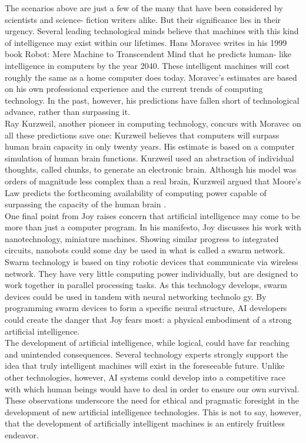 The scenarios above are just a few of the many that have been considered by
scientists and science- fiction writers alike. But their significance lies in their urgency.
Several leading technological minds believe that machines with this kind of intelligence
may exist within our lifetimes. Hans Moravec writes in his 1999 book Robot: Mere
Machine to Transcendent Mind that he predicts human- like intelligence in computers by
the year 2040. These intelligent machines will cost roughly the same as a home computer
does today. Moravec’s estimates are based on his own professional experience and the
current trends of computing technology. In the past, however, his predictions have fallen
short of technological advance, rather than surpassing it.\\
Ray Kurzweil, another pioneer in computing technology, concurs with Moravec
on all these predictions save one: Kurzweil believes that computers will surpass human
brain capacity in only twenty years. His estimate is based on a computer simulation of
human brain functions. Kurzweil used an abstraction of individual thoughts, called
chunks, to generate an electronic brain. Although his model was orders of magnitude less
complex than a real brain, Kurzweil argued that Moore’s Law predicts the forthcoming
availability of computing power capable of surpassing the capacity of the human brain
.\\
One final point from Joy raises concern that artificial intelligence may come to be
more than just a computer program. In his manifesto, Joy discusses his work with
nanotechnology, miniature machines. Showing similar progress to integrated circuits,
nanobots could some day be used in what is called a swarm network. Swarm technology
is based on tiny robotic devices that communicate via wireless network. They have very
little computing power individually, but are designed to work together in parallel
processing tasks. As this technology develops, swarm devices could be used in tandem
with neural networking technolo gy. By programming swarm devices to form a specific
neural structure, AI developers could create the danger that Joy fears most: a physical
embodiment of a strong artificial intelligence.\\
The development of artificial intelligence, while logical, could have far reaching
and unintended consequences. Several technology experts strongly support the idea that
truly intelligent machines will exist in the foreseeable future. Unlike other technologies,
however, AI systems could develop into a competitive race with which human beings
would have to deal in order to ensure our own survival. These observations underscore the need for ethical and pragmatic foresight in the development of new artificial
intelligence technologies. This is not to say, however, that the development of artificially
intelligent machines is an entirely fruitless endeavor.